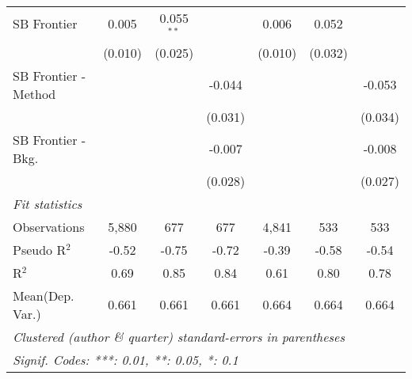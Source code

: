 \begin{tabular}{lcccccc}
   SB Frontier          & 0.005   & 0.055$^{**}$ &         & 0.006   & 0.052        &   \\   
                        & (0.010) & (0.025)      &         & (0.010) & (0.032)      &   \\   
   SB Frontier - Method &         &              & -0.044  &         &              & -0.053\\   
                        &         &              & (0.031) &         &              & (0.034)\\   
   SB Frontier - Bkg.   &         &              & -0.007  &         &              & -0.008\\   
                        &         &              & (0.028) &         &              & (0.027)\\   
   \midrule
   \emph{Fit statistics}\\
   Observations         & 5,880   & 677          & 677     & 4,841   & 533          & 533\\  
   Pseudo R$^2$         & -0.52   & -0.75        & -0.72   & -0.39   & -0.58        & -0.54\\  
   R$^2$                & 0.69    & 0.85         & 0.84    & 0.61    & 0.80         & 0.78\\  
Mean(Dep. Var.) & 0.661 & 0.661 & 0.661 & 0.664 & 0.664 & 0.664 \\
   \midrule \midrule
   \multicolumn{7}{l}{\emph{Clustered (author \& quarter) standard-errors in parentheses}}\\
   \multicolumn{7}{l}{\emph{Signif. Codes: ***: 0.01, **: 0.05, *: 0.1}}\\
\end{tabular}
\par\endgroup
